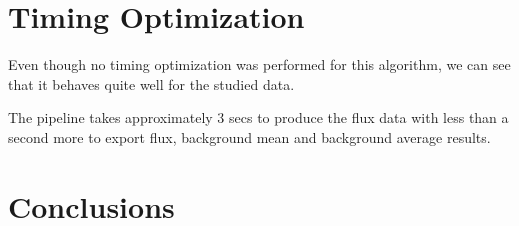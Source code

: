 \documentclass{aa}
\begin{document}
\section{Timing Optimization}

Even though no timing optimization was performed for this algorithm, we can see that it behaves quite well for the studied data.

The pipeline takes approximately 3 secs to produce the flux data with less than a second more to export flux, background mean and background average results.

\section{Conclusions}



%

%
%
\end{document}
